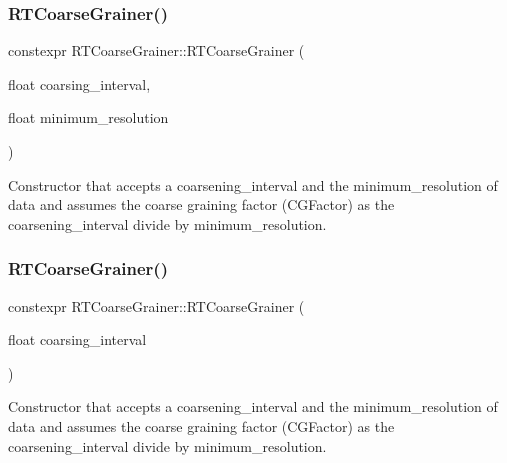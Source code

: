 \subsubsection{\texorpdfstring{R\+T\+Coarse\+Grainer()}{RTCoarseGrainer()}\hspace{0.1cm}{\footnotesize\ttfamily [1/2]}}
{\footnotesize\ttfamily constexpr R\+T\+Coarse\+Grainer\+::\+R\+T\+Coarse\+Grainer (\begin{DoxyParamCaption}\item[{float}]{coarsing\+\_\+interval,  }\item[{float}]{minimum\+\_\+resolution }\end{DoxyParamCaption})\hspace{0.3cm}{\ttfamily [inline]}}



Constructor that accepts a {\ttfamily coarsening\+\_\+interval} and the {\ttfamily minimum\+\_\+resolution} of data and assumes the coarse graining factor ({\ttfamily C\+G\+Factor}) as the {\ttfamily coarsening\+\_\+interval} divide by {\ttfamily minimum\+\_\+resolution}. 

\mbox{\label{classRTCoarseGrainer_af46c3757bdda8ce79f8655d5556d845b}} 
\subsubsection{\texorpdfstring{R\+T\+Coarse\+Grainer()}{RTCoarseGrainer()}\hspace{0.1cm}{\footnotesize\ttfamily [2/2]}}
{\footnotesize\ttfamily constexpr R\+T\+Coarse\+Grainer\+::\+R\+T\+Coarse\+Grainer (\begin{DoxyParamCaption}\item[{float}]{coarsing\+\_\+interval }\end{DoxyParamCaption})\hspace{0.3cm}{\ttfamily [inline]}}



Constructor that accepts a {\ttfamily coarsening\+\_\+interval} and the {\ttfamily minimum\+\_\+resolution} of data and assumes the coarse graining factor ({\ttfamily C\+G\+Factor}) as the {\ttfamily coarsening\+\_\+interval} divide by {\ttfamily minimum\+\_\+resolution}. 




